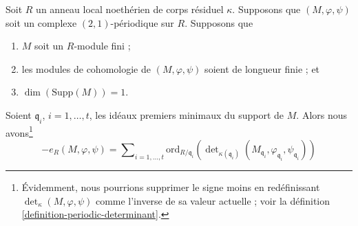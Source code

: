 \begin{proposition}
\label{proposition-length-determinant-periodic-complex}
Soit $R$ un anneau local noethérien de corps résiduel $\kappa$.
Supposons que $(M, \varphi, \psi)$ soit un complexe $(2, 1)$-périodique
sur $R$. Supposons que
\begin{enumerate}
\item $M$ soit un $R$-module fini ;
\item les modules de cohomologie de $(M, \varphi, \psi)$ soient de longueur finie ; et
\item $\dim(\text{Supp}(M)) = 1$.
\end{enumerate}
Soient $\mathfrak q_i$, $i = 1, \ldots, t$, les idéaux
premiers minimaux du support de $M$. Alors nous avons\footnote{
Évidemment, nous pourrions supprimer le signe moins en redéfinissant
$\det_\kappa(M, \varphi, \psi)$ comme l'inverse de sa
valeur actuelle ; voir la définition \ref{definition-periodic-determinant}.}
$$
- e_R(M, \varphi, \psi) =
\sum\nolimits_{i = 1, \ldots, t}
\text{ord}_{R/\mathfrak q_i}\left(
\det\nolimits_{\kappa(\mathfrak q_i)}
(M_{\mathfrak q_i}, \varphi_{\mathfrak q_i}, \psi_{\mathfrak q_i})
\right)
$$
\end{proposition}

